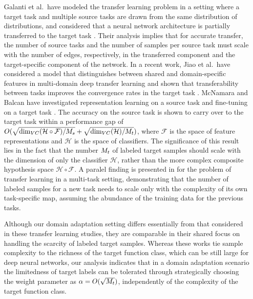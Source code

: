 \documentclass[review,supplement,onefignum,onetabnum]{siamonline250211}
\begin{document}
Galanti et al.~have modeled the transfer learning problem in a setting where a target task and multiple source tasks are drawn from the same distribution of distributions, and considered that a neural network architecture is partially transferred to the target task \cite{TomerWH16}. Their analysis implies that for accurate transfer, the number of source tasks and the number of samples  per source task must scale with the number of edges, respectively, in the transferred component and the target-specific component of the network. In a recent work, Jiao et al.~have considered a model that distinguishes between shared and domain-specific features in multi-domain deep transfer learning and shown that transferability between tasks improves the convergence rates in the target task \cite{JiaoLLY24}. McNamara and Balcan have investigated representation learning on a source task and fine-tuning on a target task  \cite{McNamaraB17}. The accuracy on the source task is shown to carry over to the target task within a performance gap of $O(\sqrt{\text{dim}_{VC}(\mathcal{H \circ F}) / M_s} + \sqrt{\text{dim}_{VC}(\mathcal{H})/M_t} )$, where $\mathcal{F}$ is the space of feature representations and $\mathcal{H}$ is the space of classifiers. The significance of this result lies in the fact that the number $M_t$ of labeled target samples should scale with the dimension of only the classifier $\mathcal{H}$, rather than the more complex composite hypothesis space $\mathcal{H \circ F}$. A paralel finding is presented in \cite{TripuraneniJJ20} for the problem of transfer learning in a multi-task setting, demonstrating that the number of labeled samples for a new task needs to scale only with the complexity of its own task-specific map, assuming the abundance of the training data for the previous tasks. 

\begin{remark}
Although our domain adaptation setting differs essentially from that considered in these transfer learning studies, they are comparable in their shared focus on handling the scarcity of labeled target samples. Whereas these works tie sample complexity to the richness of the target function class, which can be still large for deep neural networks, our analysis indicates that in a domain adaptation scenario the limitedness of target labels can be tolerated through strategically choosing the weight parameter as $\alpha=O(\sqrt{M_t})$,  independently of the complexity of  the target function class.
\end{remark}
\end{document}
